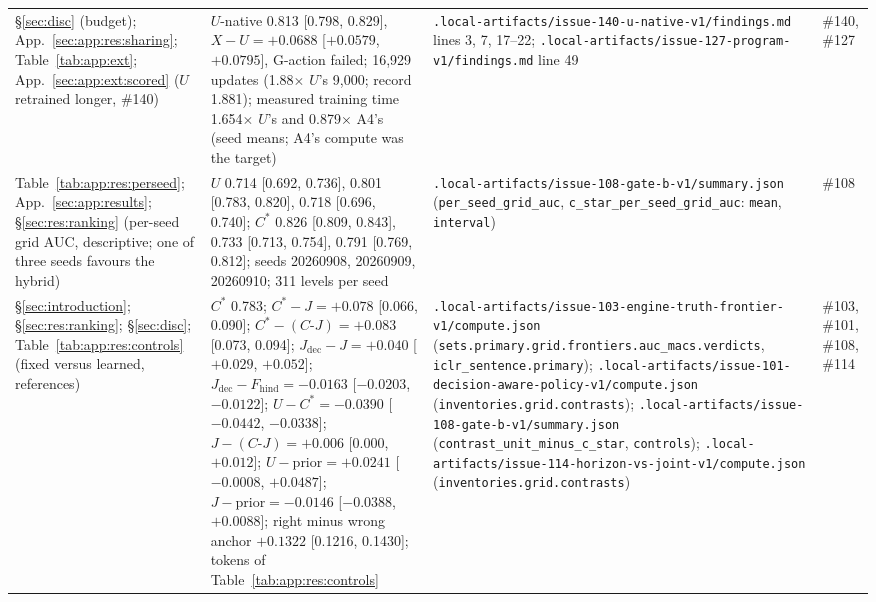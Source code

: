 {\begin{revblock}
\begin{longtable}{@{}>{\raggedright\arraybackslash}p{}>{\raggedright\arraybackslash}p{}>{\raggedright\arraybackslash}p{}>{\raggedright\arraybackslash}p{}@{}}
\S\ref{sec:disc} (budget); App.~\ref{sec:app:res:sharing}; Table~\ref{tab:app:ext}; App.~\ref{sec:app:ext:scored} ($U$ retrained longer, \#140) & $U$-native 0.813 [0.798, 0.829], $X-U=+0.0688$ [$+0.0579$, $+0.0795$], G-action failed; 16,929 updates (1.88$\times$ $U$'s 9,000; record 1.881); measured training time 1.654$\times$ $U$'s and 0.879$\times$ A4's (seed means; A4's compute was the target) & \nolinkurl{.local-artifacts/issue-140-u-native-v1/findings.md} lines 3, 7, 17--22; \nolinkurl{.local-artifacts/issue-127-program-v1/findings.md} line 49 & \#140, \#127 \\
Table~\ref{tab:app:res:perseed}; App.~\ref{sec:app:results}; \S\ref{sec:res:ranking} (per-seed grid AUC, descriptive; one of three seeds favours the hybrid) & $U$ 0.714 [0.692, 0.736], 0.801 [0.783, 0.820], 0.718 [0.696, 0.740]; $C^{*}$ 0.826 [0.809, 0.843], 0.733 [0.713, 0.754], 0.791 [0.769, 0.812]; seeds 20260908, 20260909, 20260910; 311 levels per seed & \nolinkurl{.local-artifacts/issue-108-gate-b-v1/summary.json} (\nolinkurl{per_seed_grid_auc}, \nolinkurl{c_star_per_seed_grid_auc}: \texttt{mean}, \texttt{interval}) & \#108 \\
\S\ref{sec:introduction}; \S\ref{sec:res:ranking}; \S\ref{sec:disc}; Table~\ref{tab:app:res:controls} (fixed versus learned, references) & $C^{*}$ 0.783; $C^{*}-J=+0.078$ [0.066, 0.090]; $C^{*}-(C\text{-}J)=+0.083$ [0.073, 0.094]; $J_{\mathrm{dec}}-J=+0.040$ [$+0.029$, $+0.052$]; $J_{\mathrm{dec}}-F_{\mathrm{hind}}=-0.0163$ [$-0.0203$, $-0.0122$]; $U-C^{*}=-0.0390$ [$-0.0442$, $-0.0338$]; $J-(C\text{-}J)=+0.006$ [0.000, $+0.012$]; $U-\text{prior}=+0.0241$ [$-0.0008$, $+0.0487$]; $J-\text{prior}=-0.0146$ [$-0.0388$, $+0.0088$]; right minus wrong anchor $+0.1322$ [0.1216, 0.1430]; tokens of Table~\ref{tab:app:res:controls} & \nolinkurl{.local-artifacts/issue-103-engine-truth-frontier-v1/compute.json} (\nolinkurl{sets.primary.grid.frontiers.auc_macs.verdicts}, \nolinkurl{iclr_sentence.primary}); \nolinkurl{.local-artifacts/issue-101-decision-aware-policy-v1/compute.json} (\nolinkurl{inventories.grid.contrasts}); \nolinkurl{.local-artifacts/issue-108-gate-b-v1/summary.json} (\nolinkurl{contrast_unit_minus_c_star}, \nolinkurl{controls}); \nolinkurl{.local-artifacts/issue-114-horizon-vs-joint-v1/compute.json} (\nolinkurl{inventories.grid.contrasts}) & \#103, \#101, \#108, \#114 \\

\end{longtable}
\end{revblock}}
